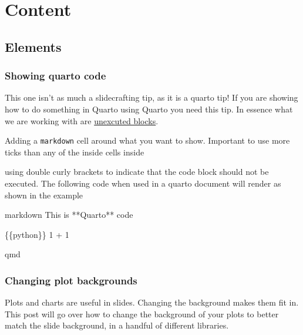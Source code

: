 \documentclass[
  letterpaper,
  DIV=11,
  numbers=noendperiod]{scrreprt}
\newenvironment{Shaded}{\begin{snugshade}}{\end{snugshade}}
\newcommand{\InformationTok}[1]{\textcolor[rgb]{0.37,0.37,0.37}{#1}}
\newcommand{\NormalTok}[1]{\textcolor[rgb]{0.00,0.23,0.31}{#1}}
\begin{document}
\part{Content}

\chapter{Elements}\label{elements}

\section{Showing quarto code}\label{showing-quarto-code}

This one isn't as much a slidecrafting tip, as it is a quarto tip! If
you are showing how to do something in Quarto using Quarto you need this
tip. In essence what we are working with are
\href{https://quarto.org/docs/computations/execution-options.html\#unexecuted-blocks}{unexcuted
blocks}.

Adding a \texttt{markdown} cell around what you want to show. Important
to use more ticks than any of the inside cells inside

using double curly brackets to indicate that the code block should not
be executed. The following code when used in a quarto document will
render as shown in the example

\begin{Shaded}
\begin{Highlighting}[]
\InformationTok{\textasciigrave{}\textasciigrave{}\textasciigrave{}\textasciigrave{} markdown}
\NormalTok{This is **Quarto** code}

\InformationTok{\textasciigrave{}\textasciigrave{}\textasciigrave{}\{\{python\}\}}
\InformationTok{1 + 1}
\InformationTok{\textasciigrave{}\textasciigrave{}\textasciigrave{}}
\InformationTok{\textasciigrave{}\textasciigrave{}\textasciigrave{}\textasciigrave{}}
\end{Highlighting}
\end{Shaded}

qmd

\section{Changing plot backgrounds}\label{changing-plot-backgrounds}

Plots and charts are useful in slides. Changing the background makes
them fit in. This post will go over how to change the background of your
plots to better match the slide background, in a handful of different
libraries.
\end{document}
